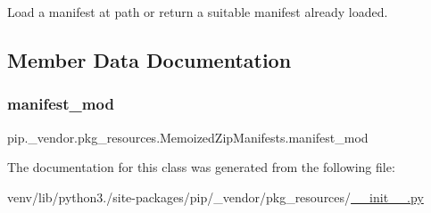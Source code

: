 \begin{DoxyVerb}Load a manifest at path or return a suitable manifest already loaded.
\end{DoxyVerb}
 

\subsection{Member Data Documentation}
\mbox{\label{classpip_1_1__vendor_1_1pkg__resources_1_1MemoizedZipManifests_a0ab18cfc421068097083100503f8ad3e}} 
\subsubsection{\texorpdfstring{manifest\+\_\+mod}{manifest\_mod}}
{\footnotesize\ttfamily pip.\+\_\+vendor.\+pkg\+\_\+resources.\+Memoized\+Zip\+Manifests.\+manifest\+\_\+mod\hspace{0.3cm}{\ttfamily [static]}}



The documentation for this class was generated from the following file\+:\begin{DoxyCompactItemize}
\item 
venv/lib/python3./site-\/packages/pip/\+\_\+vendor/pkg\+\_\+resources/\hyperlink{venv_2lib_2python3_89_2site-packages_2pip_2__vendor_2pkg__resources_2____init_____8py}{\+\_\+\+\_\+init\+\_\+\+\_\+.\+py}\end{DoxyCompactItemize}
